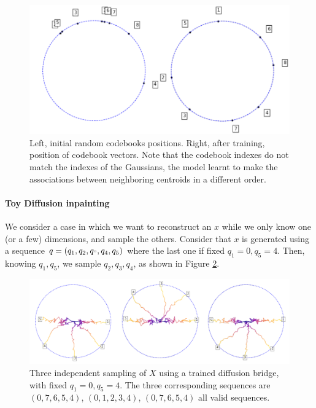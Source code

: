 \documentclass{article}
\theoremstyle{plain}
\theoremstyle{definition}
\theoremstyle{remark}
\begin{document}
\begin{figure}[h!]
    \centering
    \includegraphics[scale=0.55]{./codebookstraining.pdf}
    \caption{Left, initial random codebooks positions. Right, after training, position of codebook vectors. Note that the codebook indexes do not match the indexes of the Gaussians, the model learnt to make the associations between neighboring centroids in a different order.}
    \label{ap:codebooks}
\end{figure}

\paragraph{Toy Diffusion inpainting}

\label{ap:toyinpainting}
We consider a case in which we want to reconstruct an $x$ while we only know one (or a few) dimensions, and sample the others. Consider that $x$ is generated using a sequence $q= (q_1,q_2,q_",q_4,q_5)$ where the last one if fixed $q_1 = 0, q_5 = 4$. Then, knowing $q_1, q_5$, we sample $q_2,q_3,q_4$, as shown in Figure \ref{fig:fixeddim}.
\begin{figure}[h!]
    \centering
    \includegraphics[scale=0.55]{./samplesFixed.pdf}
    \caption{Three independent sampling of $X$ using a trained diffusion bridge, with fixed $q_1 = 0, q_5 = 4$. The three corresponding sequences are $(0,7,6,5,4)$, $(0,1,2,3,4)$, $(0,7,6,5,4)$ all valid sequences.}
    \label{fig:fixeddim}
\end{figure}
\end{document}
